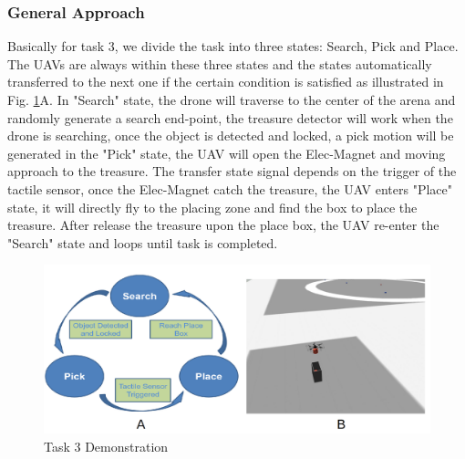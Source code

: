 \documentclass{standalone}
\begin{document}
\subsubsection{General Approach}
Basically for task 3, we divide the task into three states: Search, Pick and Place. The UAVs are always within these three states and the states automatically transferred to the next one if the certain condition is satisfied as illustrated in Fig. \ref{t3}A. In "Search" state, the drone will traverse to the center of the arena and randomly generate a search end-point, the treasure detector will work when the drone is searching, once the object is detected and locked, a pick motion will be generated in the "Pick" state, the UAV will open the Elec-Magnet and moving approach to the treasure. The transfer state signal depends on the trigger of the tactile sensor, once the Elec-Magnet catch the treasure, the UAV enters "Place" state, it will directly fly to the placing zone and find the box to place the treasure. After release the treasure upon the place box, the UAV re-enter the "Search" state and loops until task is completed.

 \begin{figure}%
    \begin{center}
      \includegraphics[keepaspectratio=true, width=1\linewidth, height=0.30\textheight]{img//task3.png}
    \end{center}
    \caption{Task 3 Demonstration}
    \label{t3}
  \end{figure}
\end{document}

